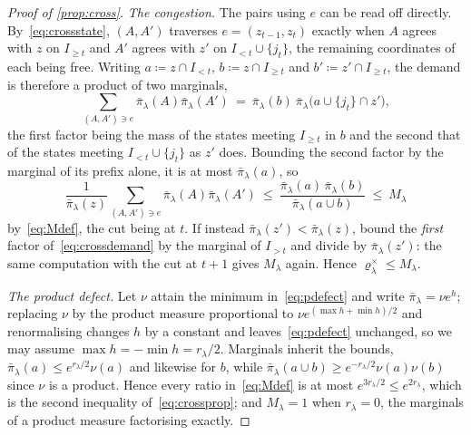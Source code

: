\begin{proof}[Proof of \cref{prop:cross}]
    \emph{The congestion.} The pairs using $e$ can be read off directly.
    By~\eqref{eq:crossstate}, $(A,A')$ traverses $e=(z_{t-1},z_t)$ exactly
    when $A$ agrees with $z$ on $I_{\geq t}$ and $A'$ agrees with $z'$ on
    $I_{<t}\cup\{j_t\}$, the remaining coordinates of each being free.
    Writing $a\coloneq z\cap I_{<t}$, $b\coloneq z\cap I_{\geq t}$ and
    $b'\coloneq z'\cap I_{\geq t}$, the demand is therefore a product of two
    marginals,
    \begin{equation}
        \label{eq:crossdemand}
        \sum_{(A,A')\ni e}\bar\pi_\lambda(A)\bar\pi_\lambda(A')
        \ =\ \bar\pi_\lambda(b)\ \bar\pi_\lambda\bigl(a\cup\{j_t\}
        \cap z'\bigr) ,
    \end{equation}
    the first factor being the mass of the states meeting $I_{\geq t}$ in
    $b$ and the second that of the states meeting $I_{<t}\cup\{j_t\}$ as
    $z'$ does. Bounding the second factor by the marginal of its prefix
    alone, it is at most $\bar\pi_\lambda(a)$, so
    \begin{equation*}
        \frac{1}{\bar\pi_\lambda(z)}
        \sum_{(A,A')\ni e}\bar\pi_\lambda(A)\bar\pi_\lambda(A')
        \ \leq\ \frac{\bar\pi_\lambda(a)\,\bar\pi_\lambda(b)}
        {\bar\pi_\lambda(a\cup b)}\ \leq\ M_\lambda
    \end{equation*}
    by~\eqref{eq:Mdef}, the cut being at $t$. If instead
    $\bar\pi_\lambda(z')<\bar\pi_\lambda(z)$, bound the \emph{first} factor
    of~\eqref{eq:crossdemand} by the marginal of $I_{>t}$ and divide by
    $\bar\pi_\lambda(z')$: the same computation with the cut at $t+1$ gives
    $M_\lambda$ again. Hence $\varrho^{\times}_\lambda\leq M_\lambda$.

    \emph{The product defect.} Let $\nu$ attain the minimum
    in~\eqref{eq:pdefect} and write $\bar\pi_\lambda=\nu e^{h}$; replacing
    $\nu$ by the product measure proportional to
    $\nu e^{(\max h+\min h)/2}$ and renormalising changes $h$ by a constant
    and leaves~\eqref{eq:pdefect} unchanged, so we may assume
    $\max h=-\min h=r_\lambda/2$. Marginals inherit the bounds,
    $\bar\pi_\lambda(a)\leq e^{r_\lambda/2}\nu(a)$ and likewise for $b$,
    while $\bar\pi_\lambda(a\cup b)\geq e^{-r_\lambda/2}\nu(a)\nu(b)$ since
    $\nu$ is a product. Hence every ratio in~\eqref{eq:Mdef} is at most
    $e^{3r_\lambda/2}\leq e^{2r_\lambda}$, which is the second inequality
    of~\eqref{eq:crossprop}; and $M_\lambda=1$ when $r_\lambda=0$, the
    marginals of a product measure factorising exactly.
\end{proof}

